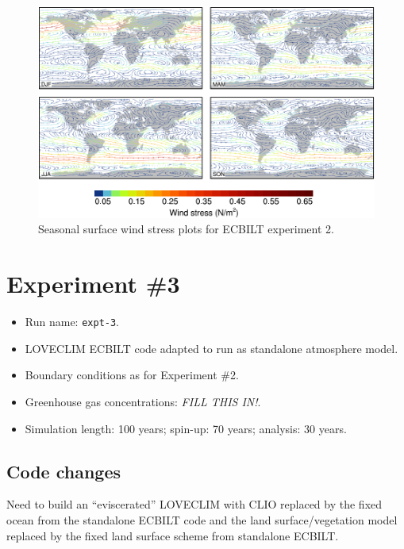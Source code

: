 \documentclass[a4paper,11pt]{article}
\begin{document}
\begin{figure}
  \begin{center}
    \includegraphics[width=\textwidth]{../expt-2/plots/stress-plots}
  \end{center}
  \caption{Seasonal surface wind stress plots for ECBILT experiment
    2.}
  \label{fig:stress-2}
\end{figure}


\section{Experiment \#3}

\begin{itemize}
  \item{Run name: \texttt{expt-3}.}
  \item{LOVECLIM ECBILT code adapted to run as standalone atmosphere
    model.}
  \item{Boundary conditions as for Experiment \#2.}
  \item{Greenhouse gas concentrations: \emph{FILL THIS IN!}.}
  \item{Simulation length: 100 years; spin-up: 70 years; analysis: 30
    years.}
\end{itemize}

\subsection{Code changes}

Need to build an ``eviscerated'' LOVECLIM with CLIO replaced by the
fixed ocean from the standalone ECBILT code and the land
surface/vegetation model replaced by the fixed land surface scheme
from standalone ECBILT.
\end{document}
